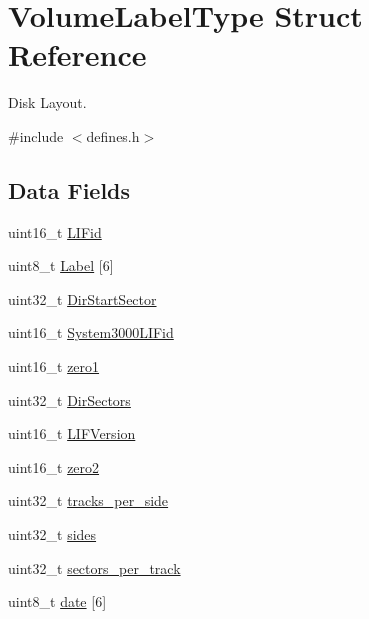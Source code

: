 \hypertarget{structVolumeLabelType}{}\section{Volume\+Label\+Type Struct Reference}
\label{structVolumeLabelType}


Disk Layout.  




{\ttfamily \#include $<$defines.\+h$>$}

\subsection*{Data Fields}
\begin{DoxyCompactItemize}
\item 
uint16\+\_\+t \hyperlink{structVolumeLabelType_a16bdde2d19114ac3238477c29fe75b4a}{L\+I\+Fid}
\item 
uint8\+\_\+t \hyperlink{structVolumeLabelType_ad8724768576a8eb4d697597ae9b90c21}{Label} \mbox{[}6\mbox{]}
\item 
uint32\+\_\+t \hyperlink{structVolumeLabelType_aa74d0d5a4d248e42b2eb2fb95dcad4a6}{Dir\+Start\+Sector}
\item 
uint16\+\_\+t \hyperlink{structVolumeLabelType_a08ea76c4d6e860804d6cfd24174d301f}{System3000\+L\+I\+Fid}
\item 
uint16\+\_\+t \hyperlink{structVolumeLabelType_a741f3741367c9c73ba24d15ac0b0e3a4}{zero1}
\item 
uint32\+\_\+t \hyperlink{structVolumeLabelType_a11e35931a035c61cddc1fa20898e9466}{Dir\+Sectors}
\item 
uint16\+\_\+t \hyperlink{structVolumeLabelType_a62003e63b2feeedb809d681e0fc4f1cc}{L\+I\+F\+Version}
\item 
uint16\+\_\+t \hyperlink{structVolumeLabelType_a18c623a319ca760c0ad57ff96346e54f}{zero2}
\item 
uint32\+\_\+t \hyperlink{structVolumeLabelType_a590051c8debbe3d157761235c0e80d79}{tracks\+\_\+per\+\_\+side}
\item 
uint32\+\_\+t \hyperlink{structVolumeLabelType_ac1e0f088685c022ec1974cb6fa4d255c}{sides}
\item 
uint32\+\_\+t \hyperlink{structVolumeLabelType_a0014a4795dfcf4117212bba590fc889e}{sectors\+\_\+per\+\_\+track}
\item 
uint8\+\_\+t \hyperlink{structVolumeLabelType_afd5885a37ea57ff74409f8c62a55bd1a}{date} \mbox{[}6\mbox{]}
\end{DoxyCompactItemize}


